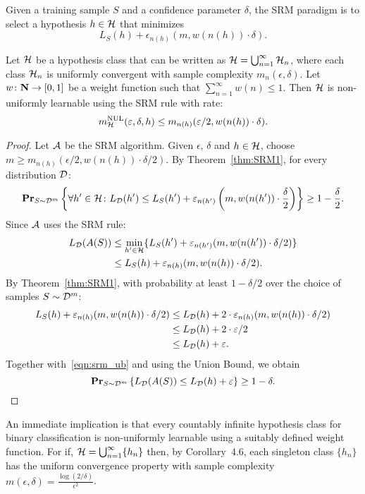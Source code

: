 Given a training sample $S$ and a confidence parameter $\delta$,
the SRM paradigm is to select a hypothesis $h \in \mathcal{H}$ that minimizes
\[
    L_S(h) + \epsilon_{n(h)} (m, w( n(h) ) \cdot \delta).
\]
\begin{theorem}
\label{thm:SRM2}
Let $\mathcal{H}$ be a hypothesis class that can be written as $\mathcal{H} =
\bigcup_{n = 1}^{\infty} \mathcal{H}_n$, where each class $\mathcal{H}_n$ is
uniformly convergent with sample complexity $m_n(\epsilon, \delta)$. Let $w
\colon \mathbf{N} \rightarrow [0, 1]$ be a weight function such that  $\sum_{n =
1}^{\infty} w(n) \leq 1$. Then $\mathcal{H}$ is non-uniformly learnable
using the SRM rule with rate:
\[
    m_{\mathcal{H}}^{\text{NUL}} (\varepsilon, \delta, h) \leq m_{n(h)} (\varepsilon / 2, w( n(h) ) \cdot \delta).
\]
\end{theorem}
\begin{proof}
Let $\mathcal{A}$ be the SRM algorithm. Given $\epsilon$, $\delta$ and $h \in \mathcal{H}$,
choose $m \geq m_{n(h)} (\epsilon / 2, w( n (h) ) \cdot \delta / 2)$.
By Theorem~\ref{thm:SRM1}, for every distribution $\mathcal{D}$:
\[
    \mathbf{Pr}_{S \sim \mathcal{D}^m} \left \{ \forall h' \in \mathcal{H} \colon L_{\mathcal{D}} (h') \leq L_S(h') +
                           \varepsilon_{n(h')} \left (m, w( n(h') ) \cdot \frac{\delta}{2} \right ) \right \} \geq 1 - \frac{\delta}{2}.
\]
Since $\mathcal{A}$ uses the SRM rule:
\begin{align}\label{eqn:srm_ub}
    L_{\mathcal{D}} (A(S))
        &  \leq \min_{h' \in \mathcal{H}} \{
            L_S(h') + \varepsilon_{n(h')} (m, w( n(h') ) \cdot \delta / 2) \} \nonumber \\
        & \leq L_S(h) +  \varepsilon_{n(h)} (m, w( n(h) ) \cdot \delta / 2).
\end{align}
By Theorem~\ref{thm:SRM1}, with probability at least  $1 - \delta / 2$ over the
choice of samples $S \sim \mathcal{D}^m$:
\begin{align}
    L_S(h) +  \varepsilon_{n(h)} (m, w( n(h) ) \cdot \delta / 2)
        & \leq L_{\mathcal{D}}(h) +  2 \cdot \varepsilon_{n(h)} (m, w( n(h) ) \cdot \delta / 2) \nonumber \\
        & \leq L_{\mathcal{D}}(h) + 2 \cdot \varepsilon / 2 \nonumber \\
        & \leq L_{\mathcal{D}}(h) + \varepsilon.
\end{align}
Together with~\ref{eqn:srm_ub} and using the Union Bound, we obtain
\[
    \mathbf{Pr}_{S \sim \mathcal{D}^m} \left \{ L_{\mathcal{D}} (A(S)) \leq L_{\mathcal{D}}(h) + \varepsilon \right \} \geq 1 - \delta.
\]
\end{proof}

An immediate implication is that every countably infinite hypothesis class for
binary classification is non-uniformly learnable using a suitably defined weight
function. For if, $\mathcal{H} = \bigcup_{n = 1}^{\infty} \{ h_n \}$ then, by
Corollary~4.6, each singleton class $\{ h_n \}$ has the uniform convergence property with
sample complexity $m (\epsilon, \delta) = \frac{\log (2 / \delta)}{\epsilon^2}$.


